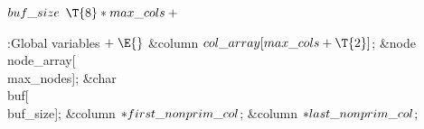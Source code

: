 \B\D$\\{buf\_size}$ \5
$\T{8}*\\{max\_cols}+{}$\par
\Y\B\4:Global variables\X${}\mathrel+\E{}$\6
\&{column} ${}\\{col\_array}[\\{max\_cols}+\T{2}]{}$;\6
\&{node} \\{node\_array}[\\{max\_nodes}];\6
\&{char} \\{buf}[\\{buf\_size}];\6
\&{column} ${}{*}\\{first\_nonprim\_col}{}$;\6
\&{column} ${}{*}\\{last\_nonprim\_col}{}$;\par
\fi

